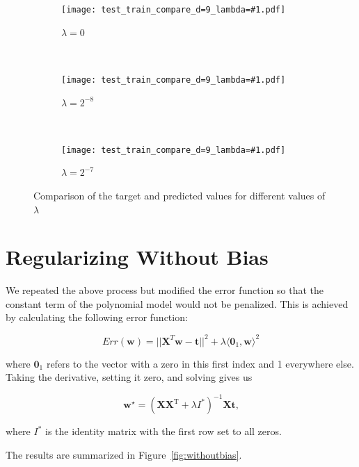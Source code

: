 \documentclass{report}
\newcommand{\wstar}{\mathbf{w}^{\star}}
\newcommand{\includeLambdaPlot}[3]{  
\begin{subfigure}[t]{#2}
  \centering
  \texttt{[image: test\_train\_compare\_d=9\_lambda=\#1.pdf]}
  \caption{$\lambda=#1$}\label{#3}
\end{subfigure}}
\begin{document}
  \begin{figure}[h]
    \centering
    \includeLambdaPlot{0}{0.3\textwidth}{fig:learnedZeroLambda}
    ~ 
    \includeLambdaPlot{2^{-8}}{0.3\textwidth}{fig:learnedTwoPowN8Lambda}
    ~
    \includeLambdaPlot{2^{-7}}{0.3\textwidth}{fig:learnedTwoPowN7Lambda}
    \caption{Comparison of the target and predicted values for different values of $\lambda$}\label{fig:learnerTargetAndPredicted}
  \end{figure}

\section{Regularizing Without Bias}
We repeated the above process but modified the error function so that the constant term of the polynomial model would not be penalized. This is achieved by calculating the following error function:

\[ Err(\mathbf{w}) = ||\mathbf{X}^{T} \mathbf{w}-\mathbf{t}||^{2} + \lambda \langle \mathbf{0}_{1}, \mathbf{w} \rangle^{2}\]

\noindent
where $\mathbf{0}_{1}$ refers to the vector with a zero in this first index and 1 everywhere else. Taking the derivative, setting it zero, and solving gives us

\[ \wstar=(\mathbf{X}\mathbf{X}^{\text{T}} + \lambda I^{*})^{-1}\mathbf{X}\mathbf{t} \textrm{,}\]  

\noindent
where $I^{*}$ is the identity matrix with the first row set to all zeros. 

The results are summarized in Figure~\ref{fig:withoutbias}.
\end{document}
